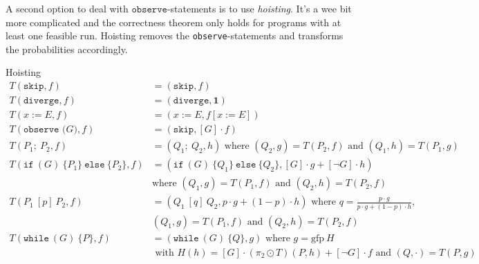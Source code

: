 \documentclass[english]{panikzettel}
\newcommand{\stmtSkip}{\texttt{skip}}
\newcommand{\stmtDiverge}{\texttt{diverge}}
\newcommand{\stmtAsgn}[2]{#1 := #2}
\newcommand{\stmtObserve}[1]{\texttt{observe (}#1\texttt{)}}
\newcommand{\stmtSeq}[2]{#1;~ #2}
\newcommand{\stmtIf}[3]{\texttt{if}~(#1)~\{ #2 \}~\texttt{else}~\{ #3 \}}
\newcommand{\stmtProb}[3]{#2 ~[#1]~ #3}
\newcommand{\stmtWhile}[2]{\texttt{while}~(#1)~\{ #2 \}}
\newcommand{\gfp}{\mathrm{gfp}~}
\begin{document}
A second option to deal with $\texttt{observe}$-statements is to use \emph{hoisting}.
It's a wee bit more complicated and the correctness theorem only holds for programs with at least one feasible run.
Hoisting removes the \texttt{observe}-statements and transforms the probabilities accordingly.

\begin{defi}{Hoisting}
	\begin{align*}
		T(\stmtSkip,f)              & = (\stmtSkip,f)                                                                                                    \\
		T(\stmtDiverge,f)           & = (\stmtDiverge,\mathbf{1})                                                                                        \\
		T(\stmtAsgn{x}{E},f)        & = (\stmtAsgn{x}{E},f[\stmtAsgn{x}{E}])                                                                             \\
		T(\stmtObserve{G},f)        & = (\stmtSkip,[G] \cdot f)                                                                                          \\
		T(\stmtSeq{P_1}{P_2},f)     & = (\stmtSeq{Q_1}{Q_2},h) \text{ where } (Q_2,g)=T(P_2,f) \text{ and } (Q_1,h)=T(P_1,g)                             \\
		T(\stmtIf{G}{P_1}{P_2},f)   & = (\stmtIf{G}{Q_1}{Q_2},[G] \cdot g + [\neg G] \cdot h)                                                            \\
		                            & \text{where } (Q_1,g)=T(P_1,f) \text{ and } (Q_2,h)=T(P_2,f)                                                       \\
		T(\stmtProb{p}{P_1}{P_2},f) & = (\stmtProb{q}{Q_1}{Q_2},p \cdot g + (1-p) \cdot h) \text{ where } q=\frac{p \cdot g}{p \cdot g + (1-p) \cdot h}, \\
		                            & (Q_1,g)=T(P_1,f) \text{ and } (Q_2,h)=T(P_2,f)                                                                     \\
		T(\stmtWhile{G}{P},f)       & = (\stmtWhile{G}{Q},g) \text{ where } g= \gfp H                                                                    \\
		                            & \text{ with } H(h)=[G] \cdot (\pi_2 \odot T)(P,h) + [\neg G] \cdot f \text{ and } (Q, \cdot)=T(P,g)                \\
	\end{align*}
\end{defi}
\end{document}
